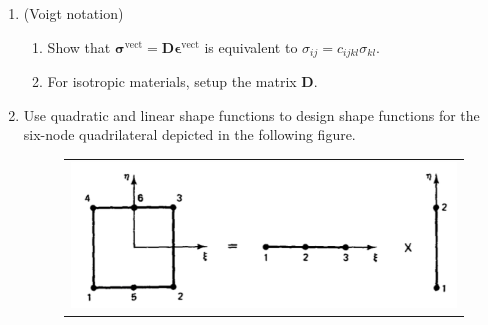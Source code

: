 \documentclass[12pt]{article}
\begin{document}
\begin{enumerate}
\begin{enumerate}
\item Consider the weak-form problem for elastostatics,
\begin{align*}
\int_{\Omega} w_{(i,j)} \sigma_{ij}d\Omega = \int_{\Omega} w_i f_i d\Omega + \int_{\Gamma_h} w_i h_i d\Gamma.
\end{align*}
If the test and trail function spaces are constructed by $C^0$ basis functions, show that
\begin{align*}
0 = \sum_{e=1}^{n_{el}} \int_{\Omega^e} w^h_i \left( \sigma^h_{ij,j} + f_i \right)d\Omega - \int_{\Gamma_h} w^h_i \left( \sigma^h_{ij}n_j - h_i \right) d\Gamma - \int_{\Gamma_{\mathrm{int}}} w^h_i \llbracket \sigma_{ij}n_j\rrbracket d\Gamma,
\end{align*}
wherein
\begin{align*}
\Gamma_{\mathrm{int}} := \cup_{e=1}^{n_{el}} \partial \Omega^e - \partial \Omega.
\end{align*}
From the above Euler-Lagrange equation, one may readily conclude that the Galerkin formulation implies
\begin{align*}
& \sigma_{ij,j} + f_i = 0, && \mbox{ in } \cup_{e=1}^{n_{el}} \Omega^e, \displaybreak[2]\\
& \sigma_{ij}n_j = h_i, && \mbox{ on } \Gamma_h, \displaybreak[2]\\
& \llbracket \sigma_{ij}n_j\rrbracket = 0, && \mbox{ on } \Gamma_{\mathrm{int}}.
\end{align*}
\end{enumerate}

\item(Voigt notation) 
\begin{enumerate}
\item Show that $\bm \sigma^{\mathrm{vect}} = \bm D \bm \epsilon^{\mathrm{vect}}$ is equivalent to $\sigma_{ij} = c_{ijkl} \sigma_{kl}$.
\item For isotropic materials, setup the matrix $\bm D$.
\end{enumerate}


\item Use quadratic and linear shape functions to design shape functions for the six-node quadrilateral depicted in the following figure.

\begin{figure}[h]
	\begin{center}
	\begin{tabular}{c}
\includegraphics[angle=0, trim=0 0 0 0, clip=true, scale = 0.35]{./6node-elem.pdf}
\end{tabular}
\end{center} 
\label{fig:quad_elem}
\end{figure}


\end{enumerate}
\end{document}
